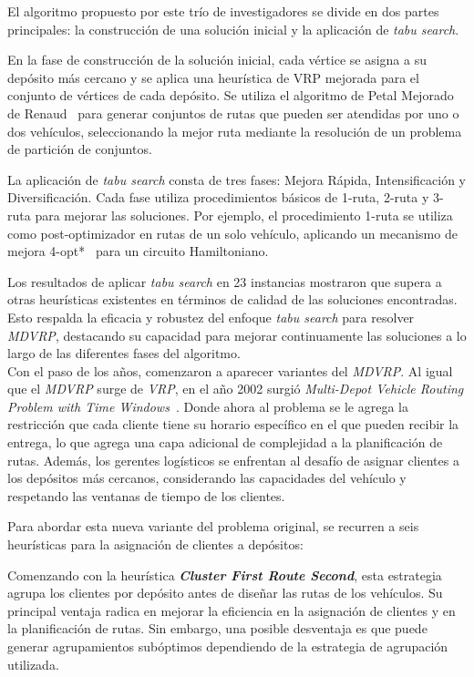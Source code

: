 \documentclass[letter, 10pt]{article}
\begin{document}
El algoritmo propuesto por este trío de investigadores se divide en dos partes principales: la construcción de una solución inicial y la aplicación de \textit{tabu search}.

En la fase de construcción de la solución inicial, cada vértice se asigna a su depósito más cercano y se aplica una heurística de VRP mejorada para el conjunto de vértices de cada depósito. Se utiliza el algoritmo de Petal Mejorado de Renaud~\cite{PetalHeuristic} para generar conjuntos de rutas que pueden ser atendidas por uno o dos vehículos, seleccionando la mejor ruta mediante la resolución de un problema de partición de conjuntos.

La aplicación de \textit{tabu search} consta de tres fases: Mejora Rápida, Intensificación y Diversificación. Cada fase utiliza procedimientos básicos de 1-ruta, 2-ruta y 3-ruta para mejorar las soluciones. Por ejemplo, el procedimiento 1-ruta se utiliza como post-optimizador en rutas de un solo vehículo, aplicando un mecanismo de mejora 4-opt*~\cite{ComputerSolutions} para un circuito Hamiltoniano.

Los resultados de aplicar \textit{tabu search} en 23 instancias mostraron que supera a otras heurísticas existentes en términos de calidad de las soluciones encontradas. Esto respalda la eficacia y robustez del enfoque \textit{tabu search} para resolver \textit{MDVRP}, destacando su capacidad para mejorar continuamente las soluciones a lo largo de las diferentes fases del algoritmo.
\\

Con el paso de los años, comenzaron a aparecer variantes del \textit{MDVRP}. Al igual que el \textit{MDVRP} surge de \textit{VRP}, en el año 2002 surgió \textit{Multi-Depot Vehicle Routing Problem with Time Windows}~\cite{MDVRPTW}. Donde ahora al problema se le agrega la restricción que cada cliente tiene su horario específico en el que pueden recibir la entrega, lo que agrega una capa adicional de complejidad a la planificación de rutas. Además, los gerentes logísticos se enfrentan al desafío de asignar clientes a los depósitos más cercanos, considerando las capacidades del vehículo y respetando las ventanas de tiempo de los clientes.

Para abordar esta nueva variante del problema original, se recurren a seis heurísticas para la asignación de clientes a depósitos:

Comenzando con la heurística \textbf{\textit{Cluster First Route Second}}, esta estrategia agrupa los clientes por depósito antes de diseñar las rutas de los vehículos. Su principal ventaja radica en mejorar la eficiencia en la asignación de clientes y en la planificación de rutas. Sin embargo, una posible desventaja es que puede generar agrupamientos subóptimos dependiendo de la estrategia de agrupación utilizada.
\end{document}
